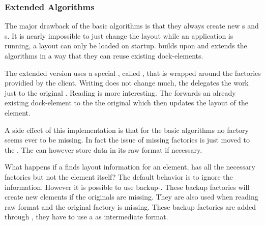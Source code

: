\subsubsection{Extended Algorithms}
The major drawback of the basic algorithms is that they always create new s and s. It is nearly impossible to just change the layout while an application is running, a layout can only be loaded on startup.  builds upon  and extends the algorithms in a way that they can reuse existing dock-elements.

The extended version uses a special , called , that is wrapped around the factories providied by the client. Writing does not change much, the  delegates the work just to the original . Reading is more interesting. The  forwards an already existing dock-element to the the original  which then updates the layout of the element.

A side effect of this implementation is that for the basic algorithms no factory seems ever to be missing. In fact the issue of missing factories is just moved to the . The  can however store data in its raw format if necessary.


What happens if a  finds layout information for an element, has all the necessary factories but not the element itself? The default behavior is to ignore the information. However it is possible to use backup-. These backup factories will create new elements if the originals are missing. They are also used when reading raw format and the original factory is missing. These backup factories are added through , they have to use a  as intermediate format.


